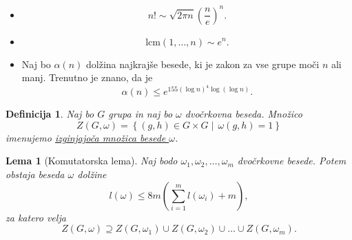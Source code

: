 \documentclass{beamer}
\newtheorem{lema}{Lema}
\newtheorem{definicija}{Definicija}
\begin{document}
\begin{frame}
    \begin{itemize}
        \item \[n! \sim \sqrt{2 \pi n} \left(\frac{n}{e}\right)^n.\]
        \item \begin{equation*} 
            \text{lcm}(1,\ldots,n) \sim e^n.
        \end{equation*}  \pause[]
          
        \item Naj bo $\alpha(n)$ dolžina najkrajše besede, ki je zakon za vse grupe moči $n$ ali manj. Trenutno je znano, da je \begin{equation*}
        \alpha(n) \le  e^{155 (\log n)^4 \log(\log n)}.
        \end{equation*}  
          
    \end{itemize}
\end{frame}

\begin{frame}
    \begin{definicija}
    Naj bo $G$ grupa in naj bo $\omega$ dvočrkovna beseda. Množico \begin{equation*}
    Z(G, \omega) = \left\{ (g,h) \in  G \times  G  \middle|\, \omega(g,h) = 1 \right\} 
    \end{equation*}imenujemo \underline{izginjajoča množica besede $\omega$}.   
       
    
    \end{definicija}
    
\end{frame}

\begin{frame}
    \begin{lema}[Komutatorska lema]
    Naj bodo $\omega_1, \omega_2, \ldots, \omega_m$ dvočrkovne besede. Potem obstaja beseda $\omega$ dolžine \begin{equation*}
    l(\omega) \le  8m\left(\sum_{i=1}^{m} l\left(\omega_i\right) + m\right),
    \end{equation*}  
    za katero velja \begin{equation*}
    Z(G, \omega) \supseteq Z(G, \omega_1) \cup  Z(G, \omega_2) \cup \ldots \cup Z(G, \omega_m).
    \end{equation*}  
      
    \end{lema}
    
\end{frame}
\end{document}
